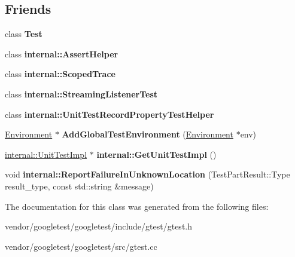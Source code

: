 \subsection*{Friends}
\begin{DoxyCompactItemize}
\item 
\mbox{\label{classtesting_1_1_unit_test_a5b78b1c2e1fa07ffed92da365593eaa4}} 
class {\bfseries Test}
\item 
\mbox{\label{classtesting_1_1_unit_test_a183151aa061362c87572e743fe233db1}} 
class {\bfseries internal\+::\+Assert\+Helper}
\item 
\mbox{\label{classtesting_1_1_unit_test_afa3927576c08d7b1e197ba16b2b3dcb7}} 
class {\bfseries internal\+::\+Scoped\+Trace}
\item 
\mbox{\label{classtesting_1_1_unit_test_adc037d188dab349a94868991955c9cd4}} 
class {\bfseries internal\+::\+Streaming\+Listener\+Test}
\item 
\mbox{\label{classtesting_1_1_unit_test_ae970f89a9f477a349fe5778be85ef42e}} 
class {\bfseries internal\+::\+Unit\+Test\+Record\+Property\+Test\+Helper}
\item 
\mbox{\label{classtesting_1_1_unit_test_a5ec26e4c31220ff8e769cc09689a4d6d}} 
\hyperlink{classtesting_1_1_environment}{Environment} $\ast$ {\bfseries Add\+Global\+Test\+Environment} (\hyperlink{classtesting_1_1_environment}{Environment} $\ast$env)
\item 
\mbox{\label{classtesting_1_1_unit_test_a56e56be7066957d612e53b5c60f6ac08}} 
\hyperlink{classtesting_1_1internal_1_1_unit_test_impl}{internal\+::\+Unit\+Test\+Impl} $\ast$ {\bfseries internal\+::\+Get\+Unit\+Test\+Impl} ()
\item 
\mbox{\label{classtesting_1_1_unit_test_a73f5a158c13793b90c80d854c9a75120}} 
void {\bfseries internal\+::\+Report\+Failure\+In\+Unknown\+Location} (Test\+Part\+Result\+::\+Type result\+\_\+type, const std\+::string \&message)
\end{DoxyCompactItemize}


The documentation for this class was generated from the following files\+:\begin{DoxyCompactItemize}
\item 
vendor/googletest/googletest/include/gtest/gtest.\+h\item 
vendor/googletest/googletest/src/gtest.\+cc\end{DoxyCompactItemize}
